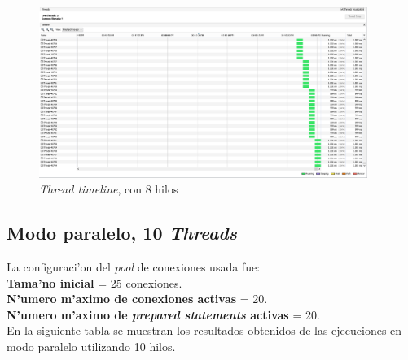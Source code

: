 \begin{figure}[H]
\centering
\includegraphics[width=0.95\textwidth]{images/Running_Time_8_Threads}
\caption{\emph{Thread timeline}, con 8 hilos}
\label{fig:6.17}
\end{figure}

\subsection{Modo paralelo, 10 \emph{Threads}}
\noindent
La configuraci'on del \emph{pool} de conexiones usada fue: \\

\textbf{Tama'no inicial} = 25 conexiones. \\
\textbf{N'umero m'aximo de conexiones activas} = 20. \\
\textbf{N'umero m'aximo de \emph{prepared statements} activas} = 20. \\

En la siguiente tabla se muestran los resultados obtenidos de las ejecuciones en modo paralelo utilizando 10 hilos. \\

\begin{table}[H]
\begin{center}
\end{center}
\caption{Resultados en modo paralelo con 10 hilos}
\end{table}

